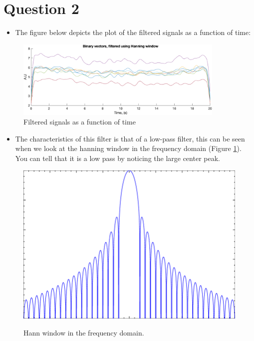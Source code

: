 \documentclass[a4paper, 12pt]{article}
\begin{document}
\newpage
\section*{Question 2}
  \begin{itemize}
    \item The figure below depicts the plot of the filtered signals as a function of time:
  \end{itemize}
  \begin{figure}[H]
    \centering
    \includegraphics[width= 10cm]{filtered.png}
    \caption{Filtered signals as a function of time}
  \end{figure}
  \begin{itemize}
    \item The characteristics of this filter is that of a low-pass filter, this can be seen
    when we look at the hanning window in the frequency domain (Figure \ref{fig:hann}). You 
    can tell that it is a low pass by noticing the large center peak.
  \end{itemize}
  \begin{figure}
    \centering
    \includegraphics[width=\textwidth]{hann-in-frequency.png}
    \label{fig:hann}
    \caption{Hann window in the frequency domain.}
  \end{figure}
\newpage
{}
%    
\end{document}
